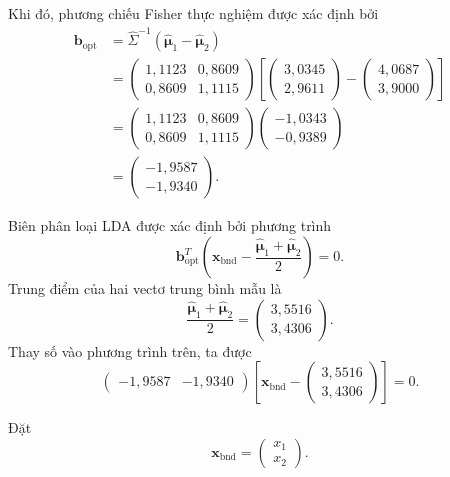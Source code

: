 Khi đó, phương chiếu Fisher thực nghiệm được xác định bởi
\[
\begin{aligned}
	\bm{b}_{\text{opt}}
	&=
	\hat{\Sigma}^{-1}
	(\hat{\bm{\mu}}_1-\hat{\bm{\mu}}_2) \\[0.2cm]
	&=
	\begin{pmatrix}
		1{,}1123 & 0{,}8609\\
		0{,}8609 & 1{,}1115
	\end{pmatrix}
	\left[
	\begin{pmatrix}
		3{,}0345\\
		2{,}9611
	\end{pmatrix}
	-
	\begin{pmatrix}
		4{,}0687\\
		3{,}9000
	\end{pmatrix}
	\right] \\[0.2cm]
	&=
	\begin{pmatrix}
		1{,}1123 & 0{,}8609\\
		0{,}8609 & 1{,}1115
	\end{pmatrix}
	\begin{pmatrix}
		-1{,}0343\\
		-0{,}9389
	\end{pmatrix} \\[0.2cm]
	&=
	\begin{pmatrix}
		-1{,}9587\\
		-1{,}9340
	\end{pmatrix}.
\end{aligned}
\]

Biên phân loại LDA được xác định bởi phương trình
\[
\bm{b}_{\text{opt}}^T
\left(
\bm{x}_{\text{bnd}}
-
\frac{\hat{\bm{\mu}}_1+\hat{\bm{\mu}}_2}{2}
\right)
=
0.
\]
Trung điểm của hai vectơ trung bình mẫu là
\[
\frac{\hat{\bm{\mu}}_1+\hat{\bm{\mu}}_2}{2}
=
\begin{pmatrix}
	3{,}5516\\
	3{,}4306
\end{pmatrix}.
\]
Thay số vào phương trình trên, ta được
\[
\begin{pmatrix}
	-1{,}9587 & -1{,}9340
\end{pmatrix}
\left[
\bm{x}_{\text{bnd}}
-
\begin{pmatrix}
	3{,}5516\\
	3{,}4306
\end{pmatrix}
\right]
=
0.
\]

Đặt
\[
\bm{x}_{\text{bnd}}
=
\begin{pmatrix}
	x_1\\
	x_2
\end{pmatrix}.
\]

